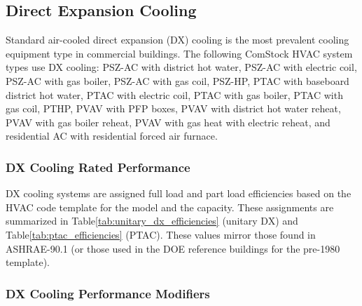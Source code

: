 

\subsection{Direct Expansion Cooling}

Standard air-cooled direct expansion (DX) cooling is the most prevalent cooling equipment type in commercial buildings. The following ComStock HVAC system types use DX cooling: PSZ-AC with district hot water, PSZ-AC with electric coil, PSZ-AC with gas boiler, PSZ-AC with gas coil, PSZ-HP, PTAC with baseboard district hot water, PTAC with electric coil, PTAC with gas boiler, PTAC with gas coil, PTHP, PVAV with PFP boxes, PVAV with district hot water reheat, PVAV with gas boiler reheat, PVAV with gas heat with electric reheat, and residential AC with residential forced air furnace.

\subsubsection{DX Cooling Rated Performance}

DX cooling systems are assigned full load and part load efficiencies based on the HVAC code template for the model and the capacity. These assignments are summarized in Table\ref{tab:unitary_dx_efficiencies} (unitary DX) and Table\ref{tab:ptac_efficiencies} (PTAC). These values mirror those found in ASHRAE-90.1 (or those used in the DOE reference buildings for the pre-1980 template).


\subsubsection{DX Cooling Performance Modifiers}

